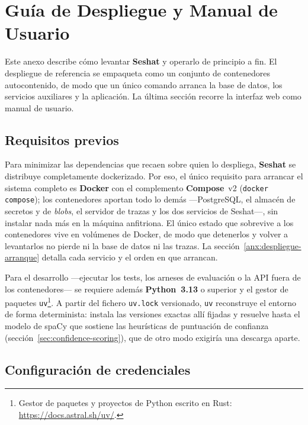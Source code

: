 \chapter{Guía de Despliegue y Manual de Usuario}
\label{anx:despliegue}

Este anexo describe cómo levantar \textbf{Seshat} y operarlo de principio a fin. El despliegue de
referencia se empaqueta como un conjunto de contenedores autocontenido, de modo que un único comando
arranca la base de datos, los servicios auxiliares y la aplicación. La última sección recorre la
interfaz web como manual de usuario.

\section{Requisitos previos}
\label{anx:despliegue-requisitos}

Para minimizar las dependencias que recaen sobre quien lo despliega, \textbf{Seshat} se distribuye
completamente dockerizado. Por eso, el único requisito para arrancar el sistema completo es
\textbf{Docker} con el complemento \textbf{Compose}~v2 (\texttt{docker compose}); los contenedores
aportan todo lo demás —PostgreSQL, el almacén de secretos y de \textit{blobs}, el servidor de trazas
y los dos servicios de Seshat—, sin instalar nada más en la máquina anfitriona. El único estado que
sobrevive a los contenedores vive en volúmenes de Docker, de modo que detenerlos y volver a
levantarlos no pierde ni la base de datos ni las trazas. La sección~\ref{anx:despliegue-arranque}
detalla cada servicio y el orden en que arrancan.

Para el desarrollo —ejecutar los tests, los arneses de evaluación o la \acs{API} fuera de los
contenedores— se requiere además \textbf{Python~3.13} o superior y el gestor de paquetes
\texttt{uv}\footnote{%
  Gestor de paquetes y proyectos de Python escrito en Rust: \url{https://docs.astral.sh/uv/}.%
}. A partir del fichero \texttt{uv.lock} versionado, \texttt{uv} reconstruye el entorno de forma
determinista: instala las versiones exactas allí fijadas y resuelve hasta el modelo de spaCy que
sostiene las heurísticas de puntuación de confianza (sección~\ref{sec:confidence-scoring}), que de
otro modo exigiría una descarga aparte.

\section{Configuración de credenciales}
\label{anx:despliegue-credenciales}

